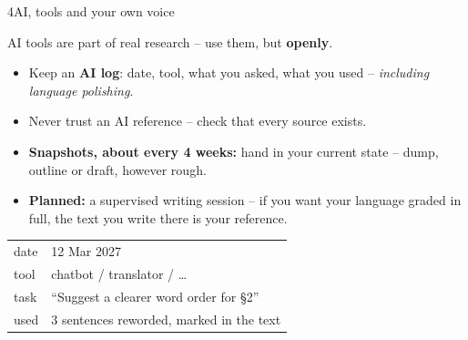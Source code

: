 \begin{wsbox}{4}{AI, tools and your own voice}
\begin{minipage}[t]{0.63\linewidth}\vspace{0pt}
AI tools are part of real research – use them, but \textbf{openly}.
\begin{itemize}[itemsep=0.5mm]
\item Keep an \textbf{AI log}: date, tool, what you asked, what you used – \emph{including language polishing}.
\item Never trust an AI reference – check that every source exists.
\item \textbf{Snapshots, about every 4 weeks:} hand in your current state – dump, outline or draft, however rough.
\item \textbf{Planned:} a supervised writing session – if you want your language graded in full, the text you write there is your reference.
\end{itemize}
\end{minipage}\hfill
\begin{minipage}[t]{0.33\linewidth}\vspace{0pt}
\begin{secbox}
\par\vspace{1mm}
{\footnotesize
\begin{tabularx}{\linewidth}{@{}l X@{}}
date & 12 Mar 2027\\
tool & chatbot / translator / …\\
task & “Suggest a clearer word order for §2”\\
used & 3 sentences reworded, marked in the text\\
\end{tabularx}}
\end{secbox}
\end{minipage}
\end{wsbox}


